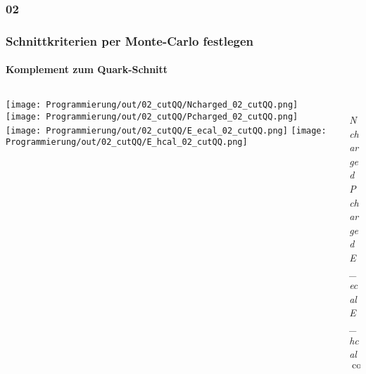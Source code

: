 \documentclass{beamer}
\begin{document}
\subsubsection{02}
\begin{frame}
	\frametitle{Schnittkriterien per Monte-Carlo festlegen}
	\framesubtitle{Komplement zum Quark-Schnitt}
	\begin{columns}
		\begin{column}{0.95\textwidth}
			\texttt{[image: Programmierung/out/02\_cutQQ/Ncharged\_02\_cutQQ.png]}
			\texttt{[image: Programmierung/out/02\_cutQQ/Pcharged\_02\_cutQQ.png]}
			\newline
			\texttt{[image: Programmierung/out/02\_cutQQ/E\_ecal\_02\_cutQQ.png]}
			\texttt{[image: Programmierung/out/02\_cutQQ/E\_hcal\_02\_cutQQ.png]}
		\end{column}
		\begin{column}{0.2\textwidth}
			\\
			{\color{blue}\textit{Ncharged}}\newline
					\\
			{\color{blue}\textit{Pcharged}}\newline
					\\
			{\color[rgb]{0.6,0.6,0}\textit{E\_ecal}}\newline
					\\
			{\color[rgb]{1,0,1}\textit{E\_hcal}}\newline
					\\
			$\cos\_thet$\newline
								\\
			\\
			\\
			\\
			\\
		\end{column}
	\end{columns}
\end{frame}
\end{document}
